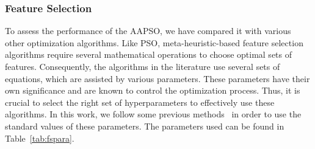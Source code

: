 \documentclass[final,3p,times]{elsarticle}
\begin{document}
\subsubsection{Feature Selection}
{{To assess the performance of the AAPSO, we have compared it with various other optimization algorithms. Like PSO, meta-heuristic-based }feature selection algorithms require several mathematical operations to choose optimal sets of features. Consequently, the algorithms in the literature use several sets of equations, which are assisted by various parameters. These parameters have their own significance and are known to control the optimization process. Thus, it is crucial to select the right set of hyperparameters {to effectively} use these algorithms. In this work, we follow some previous methods~\cite{chattopadhyay2021Pneumonia,ahmed2022binary} in order to use the standard values of these parameters. The {parameters used} can be found in Table~\ref{tab:fspara}.}
\end{document}
